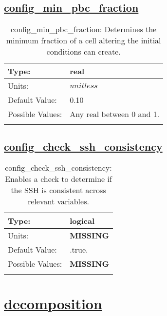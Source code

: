 \subsection[config\_min\_pbc\_fraction]{\hyperref[sec:nm_tab_grid]{config\_min\_pbc\_fraction}}
\label{subsec:nm_sec_config_min_pbc_fraction}
\begin{center}
\begin{longtable}{| p{2.0in} | p{4.0in} |}
    \hline
    Type: & real \\
    \hline
    Units: & $unitless$ \\
    \hline
    Default Value: & 0.10 \\
    \hline
    Possible Values: & Any real between 0 and 1. \\
    \hline
    \caption{config\_min\_pbc\_fraction: Determines the minimum fraction of a cell altering the initial conditions can create.}
\end{longtable}
\end{center}
\subsection[config\_check\_ssh\_consistency]{\hyperref[sec:nm_tab_grid]{config\_check\_ssh\_consistency}}
\label{subsec:nm_sec_config_check_ssh_consistency}
\begin{center}
\begin{longtable}{| p{2.0in} | p{4.0in} |}
    \hline
    Type: & logical \\
    \hline
    Units: & {\bf \color{red} MISSING} \\
    \hline
    Default Value: & .true. \\
    \hline
    Possible Values: & {\bf \color{red} MISSING} \\
    \hline
    \caption{config\_check\_ssh\_consistency: Enables a check to determine if the SSH is consistent across relevant variables.}
\end{longtable}
\end{center}
\section[decomposition]{\hyperref[sec:nm_tab_decomposition]{decomposition}}
\label{sec:nm_sec_decomposition}
